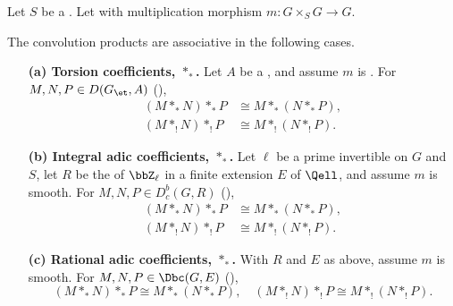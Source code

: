 \begin{proposition} \label{proposition:associativity_of_convolution_products_standard_and_compact_support_on_group_scheme_over_a_base}
    Let $S$ be a . Let  with multiplication morphism $m: G \times_S G \to G$.

    The convolution products  are associative in the following cases.
    \begin{enumerate}
        \item[\textbf{(a) Torsion coefficients, $*_*$.}] Let $A$ be a  , and assume $m$ is . For $M, N, P \in D(G_{\et}, A)$ (),
        \begin{align*}
            (M *_* N) *_* P &\cong M *_* (N *_* P), \\
            (M *_! N) *_! P &\cong M *_! (N *_! P).
        \end{align*}

        \item[\textbf{(b) Integral adic coefficients, $*_*$.}] Let $\ell$ be a prime invertible on $G$ and $S$, let $R$ be the  of $\bbZ_\ell$ in a finite extension $E$ of $\Qell$, and assume $m$ is smooth. For $M, N, P \in D_c^b(G,R)$ (),
        \begin{align*}
            (M *_* N) *_* P &\cong M *_* (N *_* P), \\
            (M *_! N) *_! P &\cong M *_! (N *_! P).
        \end{align*}

        \item[\textbf{(c) Rational adic coefficients, $*_*$.}] With $R$ and $E$ as above, assume $m$ is smooth. For $M, N, P \in \Dbc(G,E)$ (),
        $$ (M *_* N) *_* P \cong M *_* (N *_* P), \quad (M *_! N) *_! P \cong M *_! (N *_! P).$$


\end{enumerate}
\end{proposition}
